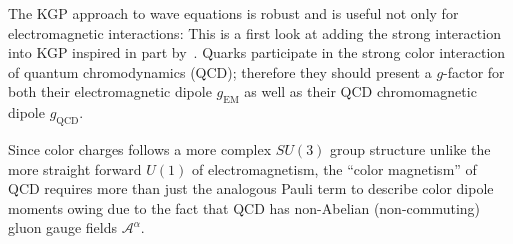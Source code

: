 
The KGP approach to wave equations is robust and is useful not only for electromagnetic interactions: This is a first look at adding the strong interaction into KGP inspired in part by~\cite{Labun:2012ra}. Quarks participate in the strong color interaction of quantum chromodynamics (QCD); therefore they should present a $g$-factor for both their electromagnetic dipole $g_\mathrm{EM}$ as well as their QCD chromomagnetic dipole $g_\mathrm{QCD}$.

Since color charges follows a more complex $SU(3)$ group structure unlike the more straight forward $U(1)$ of electromagnetism, the ``color magnetism'' of QCD requires more than just the analogous Pauli term to describe color dipole moments owing due to the fact that QCD has non-Abelian (non-commuting) gluon gauge fields $\mathcal{A}^{\alpha}$.

